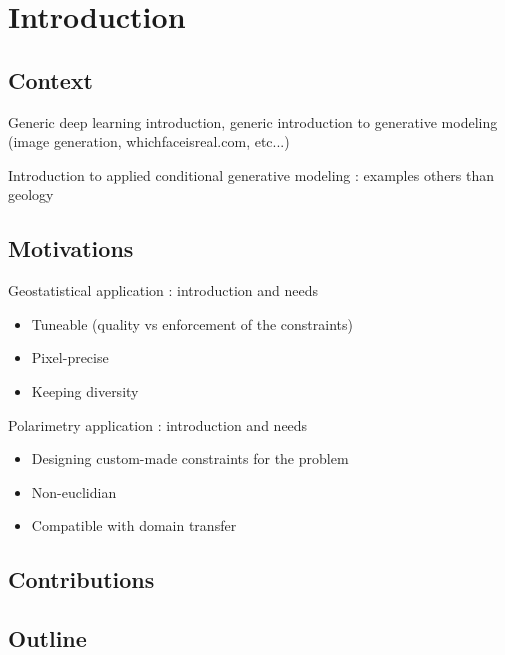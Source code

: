 \chapter{Introduction}
\label{chap:intro}
\section{Context}
Generic deep learning introduction, generic introduction to generative modeling (image generation, whichfaceisreal.com, etc...)

Introduction to applied conditional generative modeling : examples others than geology

\section{Motivations}
Geostatistical application :  introduction and needs \begin{itemize}
	\item Tuneable (quality vs enforcement of the constraints)
	\item Pixel-precise
	\item Keeping diversity
\end{itemize}

Polarimetry application : introduction and needs \begin{itemize}
	\item Designing custom-made constraints for the problem
	\item Non-euclidian
	\item Compatible with domain transfer
\end{itemize}

\section{Contributions}
\section{Outline}
